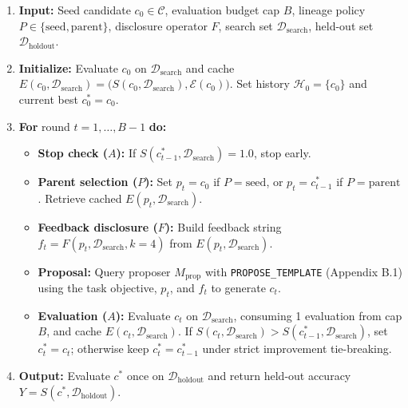 \documentclass[10pt]{article}
\providecommand{\tightlist}{%
  \setlength{\itemsep}{0pt}\setlength{\parskip}{0pt}}
\begin{document}
\begin{enumerate}
\def\labelenumi{\arabic{enumi}.}
\tightlist
\item
  \textbf{Input:} Seed candidate \(c_0 \in \mathcal{C}\), evaluation
  budget cap \(B\), lineage policy
  \(P \in \{\text{seed}, \text{parent}\}\), disclosure operator \(F\),
  search set \(\mathcal{D}_{\text{search}}\), held-out set
  \(\mathcal{D}_{\text{holdout}}\).
\item
  \textbf{Initialize:} Evaluate \(c_0\) on
  \(\mathcal{D}_{\text{search}}\) and cache
  \(E(c_0, \mathcal{D}_{\text{search}}) = \big(S(c_0, \mathcal{D}_{\text{search}}), \mathcal{E}(c_0)\big)\).
  Set history \(\mathcal{H}_0 = \{c_0\}\) and current best
  \(c^*_0 = c_0\).
\item
  \textbf{For} round \(t = 1, \dots, B - 1\) \textbf{do:}

  \begin{itemize}
  \tightlist
  \item
    \textbf{Stop check (\(A\)):} If
    \(S(c^*_{t-1}, \mathcal{D}_{\text{search}}) = 1.0\), stop early.
  \item
    \textbf{Parent selection (\(P\)):} Set \(p_t = c_0\) if
    \(P = \text{seed}\), or \(p_t = c^*_{t-1}\) if
    \(P = \text{parent}\). Retrieve cached
    \(E(p_t, \mathcal{D}_{\text{search}})\).
  \item
    \textbf{Feedback disclosure (\(F\)):} Build feedback string
    \(f_t = F(p_t, \mathcal{D}_{\text{search}}, k=4)\) from
    \(E(p_t, \mathcal{D}_{\text{search}})\).
  \item
    \textbf{Proposal:} Query proposer \(M_{\text{prop}}\) with
    \texttt{PROPOSE\_TEMPLATE} (Appendix B.1) using the task objective,
    \(p_t\), and \(f_t\) to generate \(c_t\).
  \item
    \textbf{Evaluation (\(A\)):} Evaluate \(c_t\) on
    \(\mathcal{D}_{\text{search}}\), consuming 1 evaluation from cap
    \(B\), and cache \(E(c_t, \mathcal{D}_{\text{search}})\). If
    \(S(c_t, \mathcal{D}_{\text{search}}) > S(c^*_{t-1}, \mathcal{D}_{\text{search}})\),
    set \(c^*_t = c_t\); otherwise keep \(c^*_t = c^*_{t-1}\) under
    strict improvement tie-breaking.
  \end{itemize}
\item
  \textbf{Output:} Evaluate \(c^*\) once on
  \(\mathcal{D}_{\text{holdout}}\) and return held-out accuracy
  \(Y = S(c^*, \mathcal{D}_{\text{holdout}})\).
\end{enumerate}
\end{document}
